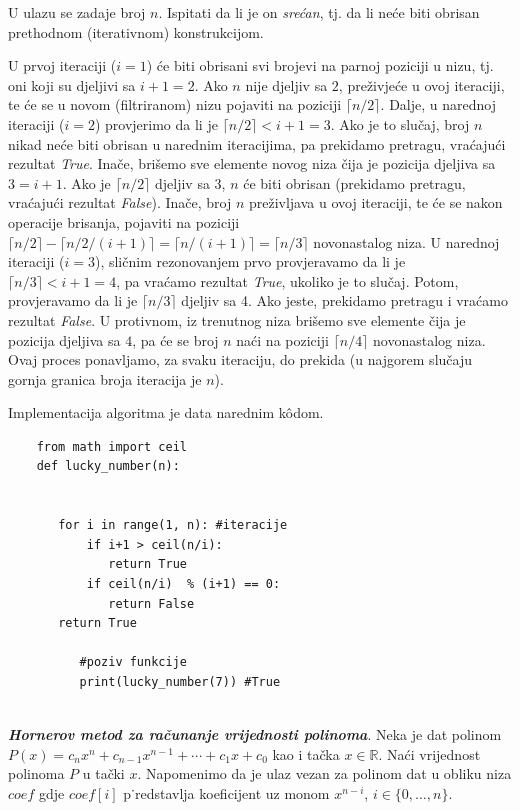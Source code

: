  U ulazu se zadaje broj $n$. Ispitati da li je on \emph{srećan}, tj. da li neće biti obrisan prethodnom (iterativnom) konstrukcijom. 
 
 \begin{solution}
U prvoj iteraciji ($i=1$) će biti obrisani svi brojevi na parnoj poziciji u nizu, tj. oni koji su djeljivi sa $i+1=2$. Ako $n$ nije djeljiv sa $2$, preživjeće u ovoj iteraciji, te će se u novom (filtriranom) nizu pojaviti na poziciji $\lceil n/2 \rceil$. Dalje, u narednoj iteraciji ($i=2$) provjerimo da li je $\lceil n/2 \rceil < i+1=3$. Ako je to slučaj, broj $n$ nikad neće biti obrisan u narednim iteracijima, pa prekidamo pretragu, vraćajući rezultat \emph{True}. Inače, brišemo sve elemente novog niza čija je pozicija djeljiva sa $3=i+1$. Ako je $\lceil n/2 \rceil$ djeljiv sa 3, $n$ će biti obrisan (prekidamo pretragu, vraćajući rezultat \emph{False}). Inače, broj $n$ preživljava u ovoj iteraciji, te će se nakon operacije brisanja, pojaviti na poziciji $\lceil n/2 \rceil - \lceil n/2 /(i+1)\rceil = \lceil n/(i+1) \rceil = \lceil n/3 \rceil$ novonastalog niza. U narednoj iteraciji ($i=3$), sličnim rezonovanjem prvo provjeravamo da li je $\lceil n/3 \rceil < i+1=4$, pa vraćamo rezultat \emph{True}, ukoliko je to slučaj. Potom, provjeravamo da li je
 $\lceil n/3 \rceil$ djeljiv sa 4. Ako jeste, prekidamo pretragu i vraćamo rezultat \emph{False}. U protivnom, iz trenutnog niza brišemo sve elemente čija je pozicija djeljiva sa $4$, pa će se broj $n$ naći na poziciji $\lceil n/4 \rceil$ novonastalog niza. Ovaj proces ponavljamo, za svaku iteraciju, do prekida (u najgorem slučaju gornja granica broja iteracija je $n$).  
 
 
 Implementacija algoritma je data narednim k\^odom. 
 
 \begin{verbatim}
 	from math import ceil
 	def lucky_number(n):
 
 	      
 	   for i in range(1, n): #iteracije
 	       if i+1 > ceil(n/i):
 	          return True 
 	       if ceil(n/i)  % (i+1) == 0:
 	          return False
 	   return True       
    
          #poziv funkcije
          print(lucky_number(7)) #True	       
  
 \end{verbatim}
  
 \end{solution}
 
\begin{definition}
	\textbf{\textit{Hornerov metod za računanje vrijednosti polinoma}}. Neka je dat polinom $P(x)=c_n x^n + c_{n-1}x^{n-1} + \cdots + c_1 x + c_0$ kao i tačka $x \in \mathbb{R}$. Naći vrijednost polinoma $P$ u tački $x$. Napomenimo da je ulaz vezan za polinom dat u obliku niza $ coef$ gdje   $coef[i]$ p˙redstavlja koeficijent uz monom  $x^{n-i}$, $i \in \{0, \ldots, n\}$. 

\end{definition}

